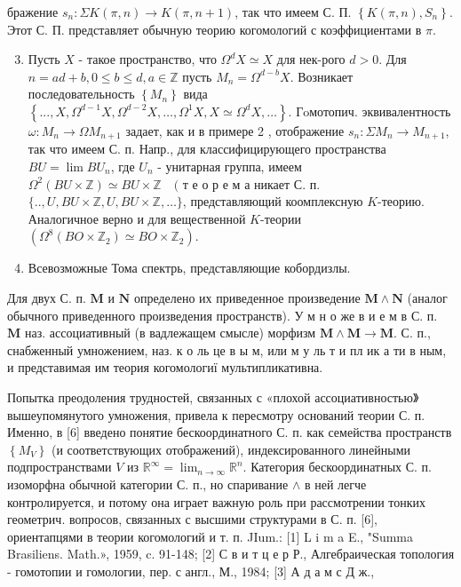 \documentclass[10pt]{article}
\begin{document}
бражение $s_{n}: \Sigma K(\pi, n) \rightarrow K(\pi, n+1)$, так что имеем С. П. $\left\{K(\pi, n), S_{n}\right\}$. Этот С. П. представляет обычную теорию когомологий с коэффициентами в $\pi$.



\begin{enumerate}

  \setcounter{enumi}{2}

  \item Пусть $X$ - такое пространство, что $\Omega^{d} X \simeq X$ для нек-рого $d>0$. Для $n=a d+b, 0 \leqslant b \leqslant d, a \in \mathbb{Z}$ пусть $M_{n}=\Omega^{d-b} X$. Возникает последовательность $\left\{M_{n}\right\}$ вида $\left\{. . ., X, \Omega^{d-1} X, \Omega^{d-2} X, \ldots, \Omega^{1} X, X \simeq \Omega^{d} X, \ldots\right\}$. Гoмотопич. эквивалентность $\omega: M_{n} \rightarrow \Omega M_{n+1}$ задает, как и в примере 2 , отображение $s_{n}: \Sigma M_{n} \rightarrow M_{n+1}$, так что имеем С. п. Напр., для классифицирующего пространства $B U=\lim B U_{n}$, где $U_{n}$ - унитарная группа, имеем $\Omega^{2}(B U \times \mathbb{Z}) \simeq B U \times \mathbb{Z} \quad($ т е о р е м а никает С. п. $\{. ., U, B U \times \mathbb{Z}, U, B U \times \mathbb{Z}, \ldots\}$, представляющий коомплексную $K$-теорию. Аналогичное верно и для вещественной $K$-теории $\left(\Omega^{8}\left(B O \times \mathbb{Z}_{2}\right) \simeq B O \times \mathbb{Z}_{2}\right)$.



  \item Всевозможные Тома спектрь, представляющие кобордизлы.



\end{enumerate}



Для двух С. п. $\boldsymbol{M}$ и $\boldsymbol{N}$ определено их приведенное произведение $\boldsymbol{M} \wedge \boldsymbol{N}$ (аналог обычного приведенного произведения пространств). У м н о же в и е м в С. п. $\boldsymbol{M}$ наз. ассоциативный (в вадлежащем смысле) морфизм $\boldsymbol{M} \wedge \boldsymbol{M} \rightarrow \boldsymbol{M}$. С. п., снабженный умножением, наз. к о ль це в ы м, или м у ль т и пл ик а ти в ным, и представимая им теория когомологиї мультипликативна.



Попытка преодоления трудностей, связанных с «плохой ассоциативностью》 вышеупомянутого умножения, привела к пересмотру оснований теории С. п. Именно, в [6] введено понятие бескоординатного С. п. как семейства пространств $\left\{M_{V}\right\}$ (и соответствующих отображений), индексированного линейными подпространствами $V$ из $\mathbb{R}^{\infty}=\lim _{n \rightarrow \infty} \mathbb{R}^{n}$. Категория бескоординатных С. п. изоморфна обычной категории С. п., но спаривание $\wedge$ в ней легче контролируется, и потому она играет важную роль при рассмотрении тонких геометрич. вопросов, связанных с высшими структурами в С. п. [6], ориентапцями в теории когомологий и т. п. JIum.: [1] L i m a E., "Summa Brasiliens. Math.», 1959, c. 91-148; [2] С в и т ц е р Р., Алгебраическая топология - гомотопии и гомологии, пер. с англ., М., 1984; [3] А д а м с Д ж.,
\end{document}
